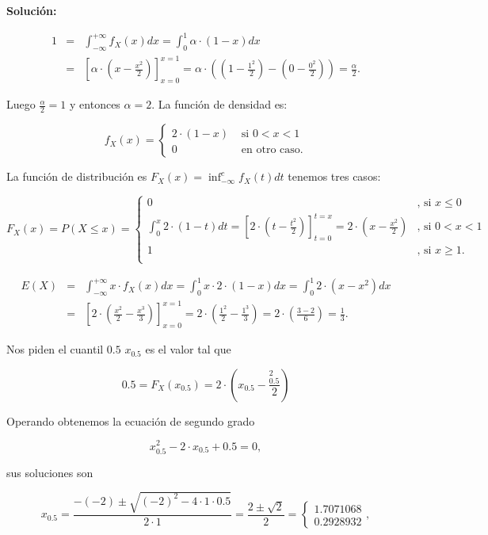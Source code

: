\documentclass[12pt]{article}\usepackage[]{graphicx}\usepackage[]{color}
\renewcommand{\leq}{\leqslant}
\renewcommand{\geq}{\geqslant}
\begin{document}
\textbf{Solución:}



\begin{eqnarray*}
1 &=&\displaystyle \int_{-\infty}^{+\infty} f_X(x) dx=\int_{0}^1 \alpha\cdot (1-x) dx\\
&=& \left[\alpha\cdot \left(x-\frac{x^2}{2}\right)\right]_{x=0}^{x=1}= \alpha\cdot \left(\left(1-\frac{1^2}{2}\right)-\left(0-\frac{0^2}{2}\right)\right)=\frac{\alpha}{2}.
\end{eqnarray*}

Luego $\frac{\alpha}{2}=1$ y entonces $\alpha=2.$ La función de densidad es:

$$
f_X(x)=\left\{
\begin{array}{ll}
2 \cdot (1-x)  & \mbox{ si } 0 < x < 1 \\
0 & \mbox{ en otro caso.}
\end{array}
\right.
$$


La función de distribución es $F_X(x)=\inf_{-\infty}^c f_X(t) dt$ tenemos tres casos:



$$
F_X(x)=P(X\leq x)=\left\{
\begin{array}{ll}
0 & \mbox{, si } x\leq 0 \\
\int_{0}^{x} 2\cdot(1-t) dt =\left[2\cdot \left(t-\frac{t^2}{2}\right)\right]_{t=0}^{t=x}
= 2\cdot \left(x-\frac{x^2}{2}\right) & \mbox{, si } 0<x<1 \\
1 & \mbox{, si } x\geq 1 .\\
\end{array}
\right.
$$


\begin{eqnarray*}
E(X)&=&\int_{-\infty}^{+\infty} x\cdot f_X(x) dx=\int_{0}^{1} x\cdot 2\cdot (1-x) dx=
\int_{0}^{1} 2\cdot (x-x^2) dx\\
&=& \left[2\cdot \left(\frac{x^2}{2}-\frac{x^3}{3}\right) \right]_{x=0}^{x=1}= 2\cdot \left(\frac{1^2}{2}-\frac{1^3}{3}\right)=2\cdot \left(\frac{3-2}{6}\right)=\frac13.
\end{eqnarray*}


Nos piden el cuantil $0.5$ $x_0.5$ es el valor tal que 

$$0.5=F_X(x_{0.5})=2\cdot \left(x_{0.5}-\frac{_{0.5}^2}{2}\right)$$

Operando obtenemos la ecuación de segundo grado 

$$x_{0.5}^2-2\cdot x_{0.5}+0.5=0,$$

sus soluciones son 

$$
x_{0.5}=\frac{-(-2) \pm\sqrt{(-2)^2 -4\cdot 1\cdot 0.5}}{2\cdot 1}=
\frac{2 \pm\sqrt{2}}{2}=
\left\{\begin{array}{l}
1.7071068\\
0.2928932
\end{array} \right.,
$$
\end{document}
